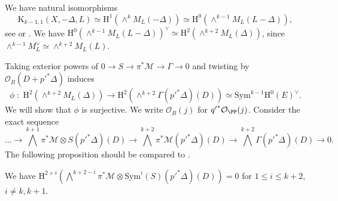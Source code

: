 We have natural isomorphisms $$\mathrm{K}_{k-1,1}(X,-\Delta, L)\simeq \mathrm{H}^1(\wedge^k M_L(-\Delta))\simeq \mathrm{H}^0(\wedge^{k-1}M_L (L-\Delta)),$$
see \cite{lazarsfeld-VBT} or \cite[\S 3]{ein-lazarsfeld-asymptotic}. We have $\mathrm{H}^0(\wedge^{k-1}M_L (L-\Delta))^{\vee} \simeq \mathrm{H}^2(\wedge^{k+2}M_L(\Delta))$, since $\wedge^{k-1}M_L^{\vee} \simeq \wedge^{k+2}M_L(L)$.


Taking exterior powers of $0 \to S \to \pi^* \mathcal{M} \to \Gamma \to 0$ and twisting by $\mathcal{O}_{B}(D+{p'}^*\Delta)$
induces
$$\phi \; : \; \mathrm{H}^2(\wedge^{k+2}M_L(\Delta)) \to \mathrm{H}^2(\wedge^{k+2} \Gamma ({p'}^*\Delta)(D))\simeq \mathrm{Sym}^{k-1}\mathrm{H}^0(E)^{\vee}.$$
We will show that $\phi$ is surjective. We write $\mathcal{O}_B(j)$ for ${q'}^*\mathcal{O}_{\PP}(j) $. Consider the exact sequence
{\small{$$\ldots \to \bigwedge^{k+1}\pi^* \mathcal{M} \otimes S({p'}^*\Delta)(D)\to  \bigwedge^{k+2}\pi^* \mathcal{M} ({p'}^*\Delta)(D) \to \bigwedge^{k+2} \Gamma ({p'}^*\Delta)(D) \to 0.$$}}
The following proposition should be compared to \cite[Lemma 6]{V2}.
\begin{prop}
\notready \label{most-of-van}
We have $\mathrm{H}^{2+i}(\bigwedge^{k+2-i} \pi^* \mathcal{M} \otimes \mathrm{Sym}^i(S) ({p'}^*\Delta)(D))=0$ for $1 \leq i \leq k+2$, $i \neq k, k+1$.
\end{prop}
